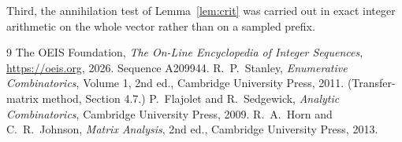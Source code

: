 \documentclass[11pt,a4paper]{article}
\theoremstyle{plain}
\theoremstyle{definition}
\begin{document}
Third, the annihilation test of Lemma~\ref{lem:crit} was carried out in exact integer
arithmetic on the whole vector rather than on a sampled prefix.

\begin{thebibliography}{9}
 The OEIS Foundation, \emph{The On-Line Encyclopedia of Integer
Sequences}, \url{https://oeis.org}, 2026. Sequence A209944.
 R.~P.~Stanley, \emph{Enumerative Combinatorics}, Volume 1, 2nd ed.,
Cambridge University Press, 2011. (Transfer-matrix method, Section 4.7.)
 P.~Flajolet and R.~Sedgewick, \emph{Analytic Combinatorics}, Cambridge
University Press, 2009.
 R.~A.~Horn and C.~R.~Johnson, \emph{Matrix Analysis}, 2nd ed., Cambridge
University Press, 2013.
\end{thebibliography}
\end{document}
